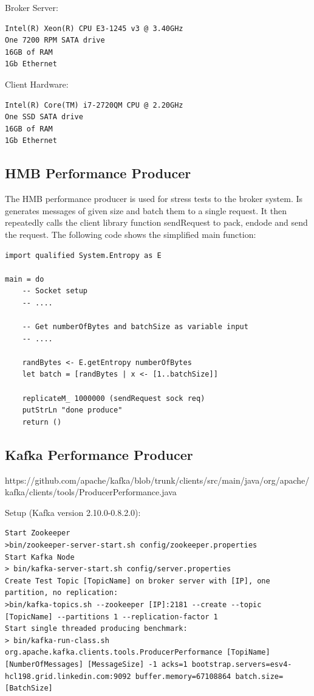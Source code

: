 Broker Server:
\begin{verbatim}
Intel(R) Xeon(R) CPU E3-1245 v3 @ 3.40GHz
One 7200 RPM SATA drive
16GB of RAM
1Gb Ethernet 
\end{verbatim}

Client Hardware:
\begin{verbatim}
Intel(R) Core(TM) i7-2720QM CPU @ 2.20GHz
One SSD SATA drive
16GB of RAM 
1Gb Ethernet
\end{verbatim}

\subsection{HMB Performance Producer}
\label{conc-eval-hmbperformanceprod}
The HMB performance producer is used for stress tests to the broker system. Is
generates messages of given size and batch them to a single request. It then
repeatedly calls the client library function sendRequest to pack, endode and
send the request. The following code shows the simplified main function: 

\begin{lstlisting}
import qualified System.Entropy as E

main = do 
    -- Socket setup 
    -- ....

    -- Get numberOfBytes and batchSize as variable input 
    -- ....

    randBytes <- E.getEntropy numberOfBytes 
    let batch = [randBytes | x <- [1..batchSize]]

    replicateM_ 1000000 (sendRequest sock req) 
    putStrLn "done produce"
    return ()

\end{lstlisting}

\subsection{Kafka Performance Producer}
\label{conc-eval-kafkaperformanceprod}

{https://github.com/apache/kafka/blob/trunk/clients/src/main/java/org/apache/kafka/clients/tools/ProducerPerformance.java}

Setup (Kafka version 2.10.0-0.8.2.0):
 
\begin{verbatim}
Start Zookeeper
>bin/zookeeper-server-start.sh config/zookeeper.properties
Start Kafka Node 
> bin/kafka-server-start.sh config/server.properties
Create Test Topic [TopicName] on broker server with [IP], one partition, no replication: 
>bin/kafka-topics.sh --zookeeper [IP]:2181 --create --topic [TopicName] --partitions 1 --replication-factor 1
Start single threaded producing benchmark: 
> bin/kafka-run-class.sh org.apache.kafka.clients.tools.ProducerPerformance [TopiName] [NumberOfMessages] [MessageSize] -1 acks=1 bootstrap.servers=esv4-hcl198.grid.linkedin.com:9092 buffer.memory=67108864 batch.size=[BatchSize]
\end{verbatim}


